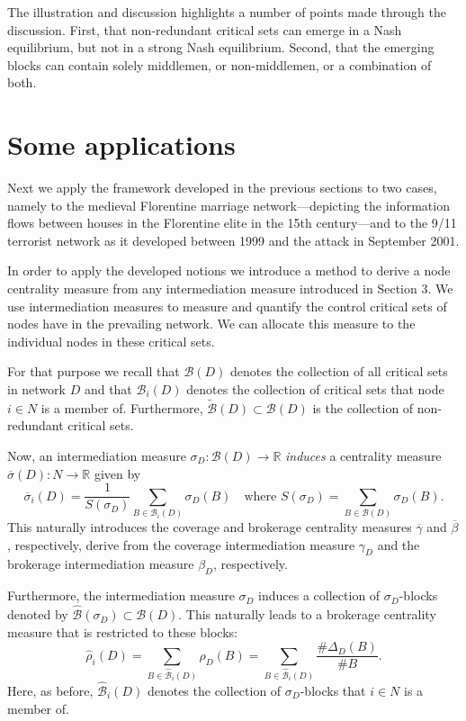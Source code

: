 The illustration and discussion highlights a number of points made through the discussion. First, that non-redundant critical sets can emerge in a Nash equilibrium, but not in a strong Nash equilibrium. Second, that the emerging blocks can contain solely middlemen, or non-middlemen, or a combination of both.

\section{Some applications}

Next we apply the framework developed in the previous sections to two cases, namely to the medieval Florentine marriage network---depicting the information flows between houses in the Florentine elite in the 15th century---and to the 9/11 terrorist network as it developed between 1999 and the attack in September 2001.

In order to apply the developed notions we introduce a method to derive a node centrality measure from any intermediation measure introduced in Section 3. We use intermediation measures to measure and quantify the control critical sets of nodes have in the prevailing network. We can allocate this measure to the individual nodes in these critical sets.

For that purpose we recall that $\mathcal{B} (D)$ denotes the collection of all critical sets in network $D$ and that $\mathcal{B}_i (D)$ denotes the collection of critical sets that node $i \in N$ is a member of. Furthermore, $\widetilde{\mathcal{B}} (D) \subset \mathcal{B} (D)$ is the collection of non-redundant critical sets.

Now, an intermediation measure $\sigma_D \colon \mathcal{B} (D) \to \mathbb{R}$ \emph{induces} a centrality measure $\overline{\sigma} (D) \colon N \to \mathbb{R}$ given by
\begin{equation}
\overline{\sigma}_i (D) = \frac{1}{S (\sigma_D)} \sum_{B \in \mathcal{B}_i (D)} \sigma_D (B) \quad \mbox{where } S(\sigma_D) = \sum_{B \in \mathcal{B} (D)} \sigma_D (B) .
\end{equation}
This naturally introduces the coverage and brokerage centrality measures $\overline{\gamma}$ and $\overline{\beta}$, respectively, derive from the coverage intermediation measure $\gamma_D$ and the brokerage intermediation measure $\beta_D$, respectively.

Furthermore, the intermediation measure $\sigma_D$ induces a collection of $\sigma_D$-blocks denoted by $\widehat{\mathcal{B}} (\sigma_D) \subset \mathcal{B} (D)$. This naturally leads to a brokerage centrality measure that is restricted to these blocks:
\begin{equation}
\widehat{\rho}_i (D) = \sum_{B \in \widehat{\mathcal{B}}_i (D)} \rho_D (B) =  \sum_{B \in \widehat{\mathcal{B}}_i (D)} \frac{\# \Delta_D (B)}{\# B} .
\end{equation}
Here, as before, $\widehat{\mathcal{B}}_i (D)$ denotes the collection of $\sigma_D$-blocks that $i \in N$ is a member of.

